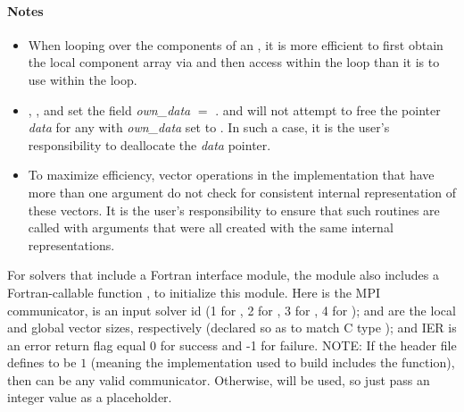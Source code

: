 \paragraph{\bf Notes} 
           
\begin{itemize}
                                        
\item
  When looping over the components of an  , it is     
  more efficient to first obtain the local component array via       
   and then access  within the     
  loop than it is to use  within the loop.        
                                                               
\item
  {\warn}, , 
  and  set the field 
  {\em own\_data} $=$ . 
   and 
  will not attempt to free the pointer {\em data} for any  with
  {\em own\_data} set to . In such a case, it is the user's responsibility to
  deallocate the {\em data} pointer.

\item
  {\warn}To maximize efficiency, vector operations in the {\nvecp} implementation
  that have more than one  argument do not check for
  consistent internal representation of these vectors. It is the user's 
  responsibility to ensure that such routines are called with 
  arguments that were all created with the same internal representations.

\end{itemize}

For solvers that include a Fortran interface module, the {\nvecp} module
also includes a Fortran-callable function
,
to initialize this {\nvecp} module.  Here  is the MPI communicator,
 is an input solver id (1 for {\cvode}, 2 for {\ida}, 3 for {\kinsol},
4 for {\arkode});  and  are the local and global
vector sizes, respectively (declared so as to match C type );
and IER is an error return flag equal 0 for success and -1 for failure.
{\warn}NOTE: If the header file  defines
 to be $1$ (meaning the {\mpi}
implementation used to build {\sundials} includes the
 function), then  can be any valid
{\mpi} communicator. Otherwise,  will be used, so
just pass an integer value as a placeholder.
